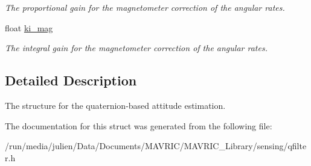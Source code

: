 \begin{DoxyCompactItemize}
\begin{DoxyCompactList}\small\item\em The proportional gain for the magnetometer correction of the angular rates. \end{DoxyCompactList}\item 
\hypertarget{structqfilter__t_a1a6080ade09117269db439f6e31192e7}{float \hyperlink{structqfilter__t_a1a6080ade09117269db439f6e31192e7}{ki\+\_\+mag}}\label{structqfilter__t_a1a6080ade09117269db439f6e31192e7}

\begin{DoxyCompactList}\small\item\em The integral gain for the magnetometer correction of the angular rates. \end{DoxyCompactList}\end{DoxyCompactItemize}


\subsection{Detailed Description}
The structure for the quaternion-\/based attitude estimation. 

The documentation for this struct was generated from the following file\+:\begin{DoxyCompactItemize}
\item 
/run/media/julien/\+Data/\+Documents/\+M\+A\+V\+R\+I\+C/\+M\+A\+V\+R\+I\+C\+\_\+\+Library/sensing/qfilter.\+h\end{DoxyCompactItemize}
